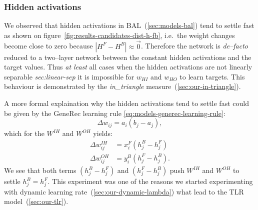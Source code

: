
\subsubsection{Hidden activations}
\label{sec:our-hidden-activation} 

We observed that hidden activations in BAL~(\ref{sec:models-bal}) tend to settle fast as shown on figure~\ref{fig:results-candidates-dist-h-fb}, i.e.~the weight changes become close to zero because $|H^F - H^B| \approx \overrightarrow{0}$. Therefore the network is \emph{de--facto} reduced to a two--layer network between the constant hidden activations and the target values. Thus \emph{at least} all cases when the hidden activations are not linearly separable \emph{sec:linear-sep} it is impossible for $w_{HI}$ and $w_{HO}$ to learn targets. This behaviour is demonstrated by the \emph{in\_triangle} measure~(\ref{sec:our-in-triangle}). 

A more formal explaination why the hidden activations tend to settle fast could be given by the GeneRec learning rule \ref{eq:models-generec-learning-rule}: 
\begin{equation} 
  \Delta w_{ij} = a_i(b_j - a_j),
\end{equation} \nonumber 
which for the $W^{IH}$ and $W^{OH}$ yields: 
\begin{align} 
  \Delta w_{ij}^{IH} &= x^F_i(h^B_j - h^F_j) \nonumber \\ 
  \Delta w_{ij}^{OH} &= y^B_i(h^F_j - h^B_j). \nonumber  
\end{align} 
We see that both terms $(h^B_j - h^F_j)$ and $(h^F_j - h^B_j)$ push $W^{IH}$ and $W^{OH}$ to settle $h^B_j = h^F_j$. This experiment was one of the reasons we started experimenting with dynamic learning rate~(\ref{sec:our-dynamic-lambda}) what lead to the TLR model~(\ref{sec:our-tlr}). 

